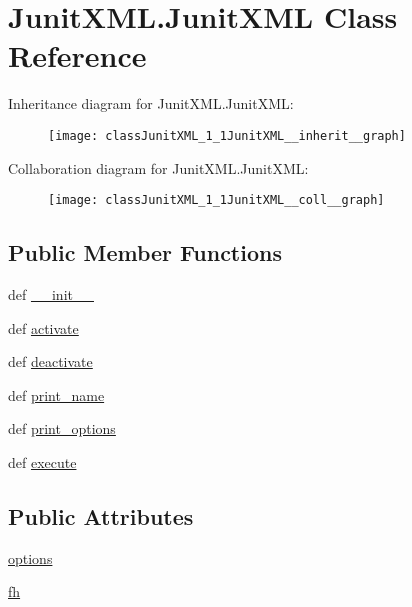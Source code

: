 \hypertarget{classJunitXML_1_1JunitXML}{\section{Junit\-X\-M\-L.\-Junit\-X\-M\-L Class Reference}
\label{classJunitXML_1_1JunitXML}
}


Inheritance diagram for Junit\-X\-M\-L.\-Junit\-X\-M\-L\-:\nopagebreak
\begin{figure}[H]
\begin{center}
\leavevmode
\texttt{[image: classJunitXML\_1\_1JunitXML\_\_inherit\_\_graph]}
\end{center}
\end{figure}


Collaboration diagram for Junit\-X\-M\-L.\-Junit\-X\-M\-L\-:\nopagebreak
\begin{figure}[H]
\begin{center}
\leavevmode
\texttt{[image: classJunitXML\_1\_1JunitXML\_\_coll\_\_graph]}
\end{center}
\end{figure}
\subsection*{Public Member Functions}
\begin{DoxyCompactItemize}
\item 
def \hyperlink{classJunitXML_1_1JunitXML_ab00a8a15bb71dab8b080006346538372}{\-\_\-\-\_\-init\-\_\-\-\_\-}
\item 
def \hyperlink{classJunitXML_1_1JunitXML_a450dcc5b34ae110e7b1759fed8ef3fea}{activate}
\item 
def \hyperlink{classJunitXML_1_1JunitXML_ace232992df91e923fa3a7052b0b80d7f}{deactivate}
\item 
def \hyperlink{classJunitXML_1_1JunitXML_acb494a8e5d7effff945ce9bf131382bd}{print\-\_\-name}
\item 
def \hyperlink{classJunitXML_1_1JunitXML_adee53e2cfaba33750e9cc05d2c429822}{print\-\_\-options}
\item 
def \hyperlink{classJunitXML_1_1JunitXML_a63079326e106ab1a42ad40b63aa6df4e}{execute}
\end{DoxyCompactItemize}
\subsection*{Public Attributes}
\begin{DoxyCompactItemize}
\item 
\hyperlink{classJunitXML_1_1JunitXML_a7fad493a74a8051511f76e4edde36a76}{options}
\item 
\hyperlink{classJunitXML_1_1JunitXML_afcf041a6fe83e6d80fb2fcd6f1bf59e3}{fh}
\end{DoxyCompactItemize}


